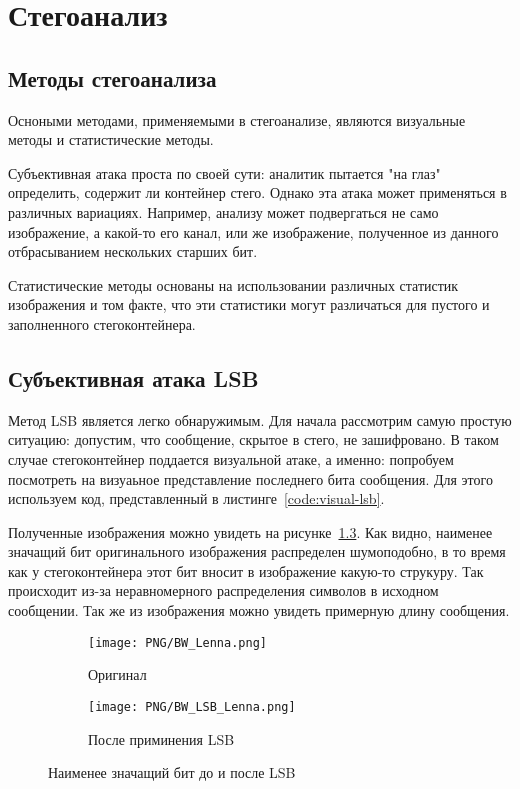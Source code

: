 \chapter{Стегоанализ}
\section{Методы стегоанализа}
Осноными методами, применяемыми в стегоанализе, являются визуальные методы и статистические методы.

Субъективная атака проста по своей сути: аналитик пытается "на глаз" определить, содержит ли контейнер стего.
Однако эта атака может применяться в различных вариациях. Например, анализу может подвергаться не само изображение,
а какой-то его канал, или же изображение, полученное из данного отбрасыванием нескольких старших бит.

Статистические методы основаны на использовании различных статистик изображения и том факте,
что эти статистики могут различаться для пустого и заполненного стегоконтейнера.

\section{Субъективная атака LSB}
Метод LSB является легко обнаружимым.
Для начала рассмотрим самую простую ситуацию: допустим,
что сообщение, скрытое в стего, не зашифровано.
В таком случае стегоконтейнер поддается визуальной атаке,
а именно: попробуем посмотреть на визуаьное представление
последнего бита сообщения. Для этого используем код,
представленный в листинге~\ref{code:visual-lsb}.

Полученные изображения можно увидеть на рисунке~\ref{img:bw-lsb}.
Как видно, наименее значащий бит оригинального изображения распределен
шумоподобно, в то время как у стегоконтейнера этот бит
вносит в изображение какую-то струкуру. Так происходит из-за
неравномерного распределения символов в исходном сообщении.
Так же из изображения можно увидеть примерную длину сообщения.
\begin{figure}[ht!]
    \centering
    \begin{subfigure}{.5\textwidth}
      \centering
      \texttt{[image: PNG/BW\_Lenna.png]}
      \caption{Оригинал}
      \label{img:bw-lenna-png}
    \end{subfigure}%
    \begin{subfigure}{.5\textwidth}
      \centering
      \texttt{[image: PNG/BW\_LSB\_Lenna.png]}
      \caption{После приминения LSB}
      \label{img:bw-lenna-lsb}
    \end{subfigure}
    \caption{Наименее значащий бит до и после LSB}
    \label{img:bw-lsb}
\end{figure}

